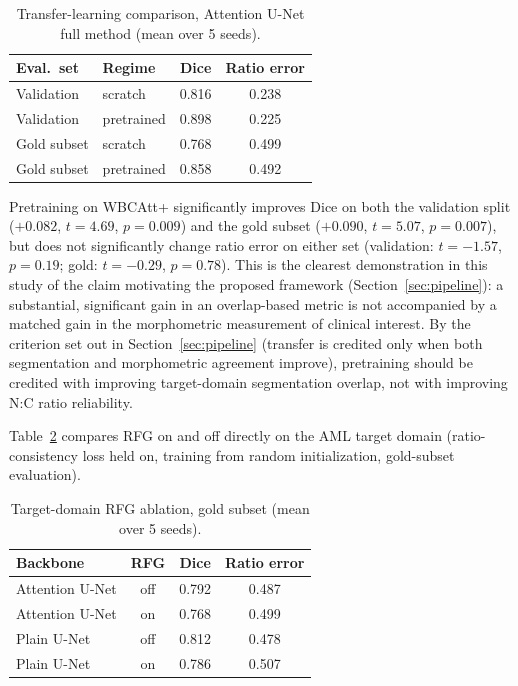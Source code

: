 \documentclass[pdflatex,sn-mathphys-num]{sn-jnl}%
\theoremstyle{thmstyleone}%
\theoremstyle{thmstyletwo}%
\theoremstyle{thmstylethree}%
\begin{document}
\begin{table}[t]
\caption{Transfer-learning comparison, Attention U-Net full method (mean over 5 seeds).}
\label{tab:transfer}
\centering
\begin{tabular}{llcc}
\toprule
Eval.\ set & Regime & Dice & Ratio error \\
\midrule
Validation   & scratch    & 0.816 & 0.238 \\
Validation   & pretrained & 0.898 & 0.225 \\
Gold subset  & scratch    & 0.768 & 0.499 \\
Gold subset  & pretrained & 0.858 & 0.492 \\
\bottomrule
\end{tabular}
\end{table}

Pretraining on WBCAtt+ significantly improves Dice on both the validation split ($+0.082$, $t=4.69$, $p=0.009$) and the gold subset ($+0.090$, $t=5.07$, $p=0.007$), but does not significantly change ratio error on either set (validation: $t=-1.57$, $p=0.19$; gold: $t=-0.29$, $p=0.78$). This is the clearest demonstration in this study of the claim motivating the proposed framework (Section~\ref{sec:pipeline}): a substantial, significant gain in an overlap-based metric is not accompanied by a matched gain in the morphometric measurement of clinical interest. By the criterion set out in Section~\ref{sec:pipeline} (transfer is credited only when both segmentation and morphometric agreement improve), pretraining should be credited with improving target-domain segmentation overlap, not with improving N:C ratio reliability.

Table~\ref{tab:amlrfg} compares RFG on and off directly on the AML target domain (ratio-consistency loss held on, training from random initialization, gold-subset evaluation).

\begin{table}[t]
\caption{Target-domain RFG ablation, gold subset (mean over 5 seeds).}
\label{tab:amlrfg}
\centering
\begin{tabular}{lccc}
\toprule
Backbone & RFG & Dice & Ratio error \\
\midrule
Attention U-Net & off & 0.792 & 0.487 \\
Attention U-Net & on  & 0.768 & 0.499 \\
Plain U-Net     & off & 0.812 & 0.478 \\
Plain U-Net     & on  & 0.786 & 0.507 \\
\bottomrule
\end{tabular}
\end{table}
\end{document}
